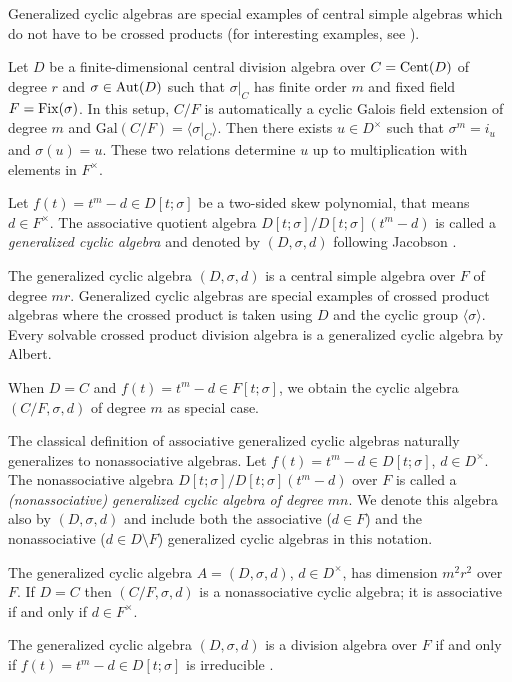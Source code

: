 \documentclass{amsart}
\theoremstyle{plain}
\theoremstyle{definition}
\numberwithin{equation}{section}
\numberwithin{figure}{section}
\begin{document}
Generalized cyclic  algebras are special examples of central simple algebras which do not have to be crossed products (for interesting examples, see \cite{TH, TH2004, TH2005}).

Let $D$ be a finite-dimensional central division algebra over $C={\rm Cent}(D)$ of degree $r$ and
$\sigma\in {\rm Aut}(D)$ such that $\sigma|_{C}$ has finite order $m$  and fixed field $F={\rm Fix}(\sigma)$.
In this setup,  $C/F$ is automatically a cyclic Galois field extension of
 degree $m$ and $\mathrm{Gal}(C/F) = \langle \sigma |_{C} \rangle$. Then there exists $u \in D^\times$ such that $\sigma^m = i_u$ and $\sigma(u) = u$. These two relations determine $u$ up to multiplication with elements in $F^\times$.


 Let $f(t)=t^m-d\in D[t;\sigma]$ be a two-sided skew polynomial, that means $d\in F^\times$. The associative quotient algebra $D[t;\sigma]/D[t;\sigma](t^m-d)$
 is called a \emph{generalized cyclic algebra} and denoted by $(D,\sigma, d)$ following Jacobson \cite[p.~19]{J96}.



 The generalized cyclic algebra
$(D,\sigma, d)$ is a central simple algebra over $F$ of degree $mr$. Generalized cyclic algebras are special examples of crossed product algebras where  the crossed product is taken using  $D$  and the cyclic group $\langle \sigma\rangle$. Every solvable crossed product division algebra is  a generalized cyclic algebra by Albert.

When $D=C$ and $ f(t)=t^m-d\in F[t;\sigma]$, we obtain the cyclic algebra $(C/F,\sigma,d)$ of degree $m$ as special case.

The classical definition of associative generalized cyclic algebras naturally generalizes to nonassociative algebras. Let $f(t)=t^m-d\in D[t;\sigma]$, $d\in D^\times$.
The nonassociative algebra $D[t;\sigma]/D[t;\sigma](t^m-d)$ over $F$ is called a \emph{(nonassociative) generalized  cyclic algebra of degree $mn$}.
 We denote this algebra also by $(D,\sigma, d)$ and include both the associative ($d\in F$) and the nonassociative ($d\in D\setminus F $) generalized cyclic algebras in this notation.

The generalized cyclic algebra $A=(D, \sigma, d)$, $d\in D^\times$, has dimension $m^2r^2$ over $F$.
If $D=C$ then $(C/F,\sigma,d)$ is a nonassociative cyclic algebra; it is associative if and only if $d\in F^\times$.

The  generalized cyclic algebra $(D, \sigma, d)$ is a division algebra over
$F$ if and only if $f(t)=t^m-d\in D[t;\sigma]$ is irreducible \cite[(7)]{P66}.
\end{document}
